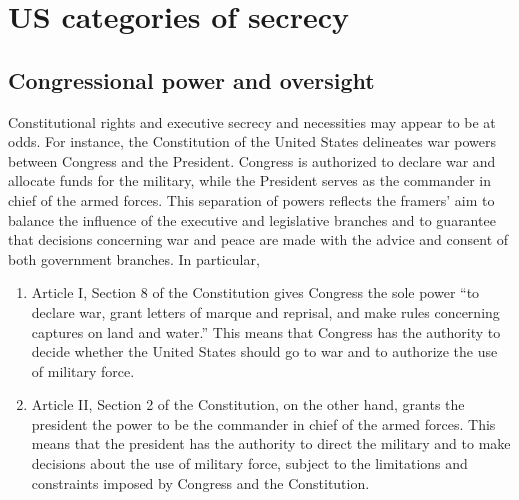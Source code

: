 %
%
%


\chapter{US categories of secrecy}
\label{2023-UFO-Appendix-USCOS} %





\section{Congressional power and oversight}
\label{2023-UFO-part-Perception-crash-retreivals-cpao}



Constitutional rights and executive secrecy and necessities may appear to be at odds. For instance, the Constitution of the United States delineates war powers between Congress and the President. Congress is authorized to declare war and allocate funds for the military, while the President serves as the commander in chief of the armed forces. This separation of powers reflects the framers' aim to balance the influence of the executive and legislative branches and to guarantee that decisions concerning war and peace are made with the advice and consent of both government branches.
In particular,
\begin{enumerate}
\item
Article I, Section 8 of the Constitution gives Congress the sole power ``to declare war, grant letters of marque and reprisal, and make rules concerning captures on land and water.'' This means that Congress has the authority to decide whether the United States should go to war and to authorize the use of military force.
\item
Article II, Section 2 of the Constitution, on the other hand, grants the president the power to be the commander in chief of the armed forces. This means that the president has the authority to direct the military and to make decisions about the use of military force, subject to the limitations and constraints imposed by Congress and the Constitution.
\end{enumerate}


